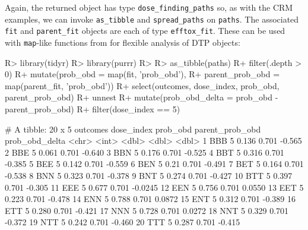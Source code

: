 \documentclass[article]{jss}
\begin{document}
Again, the returned object has type \texttt{dose\_finding\_paths} so, as
with the CRM examples, we can invoke \texttt{as\_tibble} and
\texttt{spread\_paths} on \texttt{paths}. The associated \texttt{fit}
and \texttt{parent\_fit} objects are each of type \texttt{efftox\_fit}.
These can be used with \texttt{map}-like functions from 
\citep{purrr} for flexible analysis of DTP objects:

\begin{CodeChunk}

\begin{CodeInput}
R> library(tidyr)
R> library(purrr)
R> 
R> as_tibble(paths) %
R+   filter(.depth > 0) %
R+   mutate(prob_obd = map(fit, 'prob_obd'), 
R+          parent_prob_obd = map(parent_fit, 'prob_obd')) %
R+   select(outcomes, dose_index, prob_obd, parent_prob_obd) %
R+   unnest %
R+   mutate(prob_obd_delta = prob_obd - parent_prob_obd) %
R+   filter(dose_index == 5)
\end{CodeInput}

\begin{CodeOutput}
# A tibble: 20 x 5
   outcomes dose_index prob_obd parent_prob_obd prob_obd_delta
   <chr>         <int>    <dbl>           <dbl>          <dbl>
 1 BBB               5    0.136           0.701        -0.565 
 2 BBE               5    0.061           0.701        -0.640 
 3 BBN               5    0.176           0.701        -0.525 
 4 BBT               5    0.316           0.701        -0.385 
 5 BEE               5    0.142           0.701        -0.559 
 6 BEN               5    0.21            0.701        -0.491 
 7 BET               5    0.164           0.701        -0.538 
 8 BNN               5    0.323           0.701        -0.378 
 9 BNT               5    0.274           0.701        -0.427 
10 BTT               5    0.397           0.701        -0.305 
11 EEE               5    0.677           0.701        -0.0245
12 EEN               5    0.756           0.701         0.0550
13 EET               5    0.223           0.701        -0.478 
14 ENN               5    0.788           0.701         0.0872
15 ENT               5    0.312           0.701        -0.389 
16 ETT               5    0.280           0.701        -0.421 
17 NNN               5    0.728           0.701         0.0272
18 NNT               5    0.329           0.701        -0.372 
19 NTT               5    0.242           0.701        -0.460 
20 TTT               5    0.287           0.701        -0.415 
\end{CodeOutput}
\end{CodeChunk}
\end{document}
